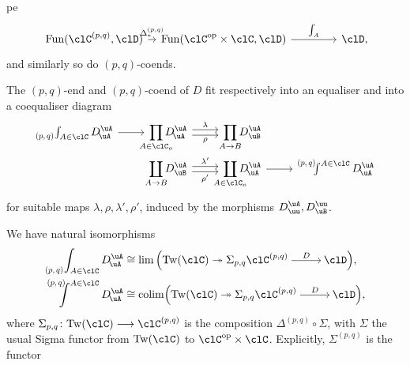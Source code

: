 \documentclass[11pt]{amsart}
\begin{document}
\begin{proposition}
\begin{enumtag}{pe}
		\[ 
			\begin{tikzcd}[row sep={11.7em,between origins}, column sep={11.7em,between origins},  ampersand replacement=\&]
				\mathrm{Fun}(\pq{\clC},\clD)
				\arrow[r, "\Delta^{(p,q)}_{*}"]
				\&
				\mathrm{Fun}(\clC^{\op}\times\clC,\clD)
				\arrow[r, "\int_{A}"]
				\&
				\clD\mathrlap{,}
			\end{tikzcd}
		\]
		and similarly so do $(p,q)$-coends.
		\item\label{p-q-ends-as-limits} The $(p,q)$-end and $(p,q)$-coend of $D$ fit respectively into an equaliser and into a coequaliser diagram
		\begin{gather*}
			\begin{tikzcd}[row sep=0cm,ampersand replacement=\&]
				\pqEnd{p}{q}{A\in\clC}D^{\uA}_{\!\uA}
				\arrow[r,outer sep=-0.1em]
				\&
				\displaystyle\prod_{\mathclap{A\in\clC_o}} D^{\uA}_{\!\uA}
				\arrow[r,shift left =1.0, "\lambda"]
				\arrow[r,shift right=1.0, "\rho"']
				\&
				\displaystyle\prod_{\mathclap{A\to B}} D^{\uA}_{\uB}\\
				\& \displaystyle\coprod_{\mathclap{A\to B}}D^{\uA}_{\uB}
				\arrow[r,shift left =1.0,"\lambda'"]
				\arrow[r,shift right=1.0,"\rho'"']
				\&
				\displaystyle\coprod_{\mathclap{A\in\clC_o}}D^{\uA}_{\!\uA}
				\arrow[r,outer sep=-0.1em]
				\&
				\pqCoend{p}{q}{A\in\clC}D^{\uA}_{\!\uA}
			\end{tikzcd}
		\end{gather*}
		for suitable maps $\lambda,\rho,\lambda',\rho'$, induced by the morphisms $D^{\uA}_{\uu}, D^{\uu}_{\uB}$.
		\item\label{p-q-ends-as-limits-again}We have natural isomorphisms
		\begin{align*}
			\pqEnd{p}{q}{A\in\clC}D^{\uA}_{\!\uA}   & \cong \lim\Big(\Tw{\clC}\twoheadrightarrow {\Sigma_{p,q}}\pq{\clC}\xloongrightarrow{D}\clD\Big),   \\
			\pqCoend{p}{q}{A\in\clC}D^{\uA}_{\!\uA} & \cong \colim\Big(\Tw{\clC}\twoheadrightarrow {\Sigma_{p,q}}\pq{\clC}\xloongrightarrow{D}\clD\Big),
		\end{align*}
		where $\Sigma_{p,q}\colon\Tw{\clC}\longrightarrow\pq{\clC}$ is the composition $\Delta^{(p,q)}\circ\Sigma$, with $\Sigma$ the usual Sigma functor from $\Tw{\clC}$ to $\clC^{\op}\times\clC$. Explicitly, $\Sigma^{(p,q)}$ is the functor

\end{enumtag}
\end{proposition}
\end{document}
